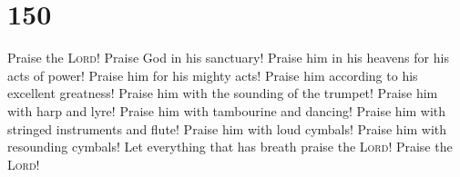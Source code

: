 \hypertarget{section-149}{%
\section{150}\label{section-149}}

 Praise the \textsc{Lord}! Praise God in his sanctuary!
Praise him in his heavens for his acts of power!  Praise
him for his mighty acts! Praise him according to his excellent
greatness!  Praise him with the sounding of the trumpet!
Praise him with harp and lyre!  Praise him with tambourine
and dancing! Praise him with stringed instruments and flute!
 Praise him with loud cymbals! Praise him with resounding
cymbals!  Let everything that has breath praise the
\textsc{Lord}! Praise the \textsc{Lord}!
